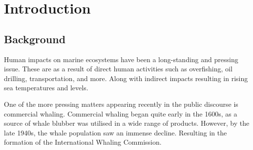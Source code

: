 \documentclass[12pt,a4paper]{article}
\renewcommand{\large}{\fontsize{14}{15}\selectfont}  %
\begin{document}
    












\newpage

\thispagestyle{empty} 
\tableofcontents
\newpage
\section{Introduction}
\subsection{Background}
Human impacts on marine ecosystems have been a long-standing and pressing issue. These are as a result of direct human activities such as overfishing, oil drilling, transportation, and more. Along with indirect impacts resulting in rising sea temperatures and levels. 

One of the more pressing matters appearing recently in the public discourse is commercial whaling. Commercial whaling began quite early in the 1600s, as a source of whale blubber was utilised in a wide range of products. However, by the late 1940s, the whale population saw an immense decline. Resulting in the formation of the International Whaling Commission. 
\end{document}
